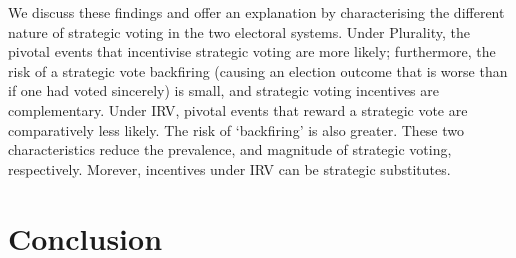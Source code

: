 \documentclass[12pt, letter]{article}
\begin{document}
We discuss these findings and offer an explanation by characterising the different nature of strategic voting in the two electoral systems. Under Plurality, the pivotal events that incentivise strategic voting are more likely; furthermore, the risk of a strategic vote backfiring (causing an election outcome that is worse than if one had voted sincerely) is small, and strategic voting incentives are complementary. Under IRV, pivotal events that reward a strategic vote are comparatively less likely. The risk of `backfiring' is also greater. These two characteristics reduce the prevalence, and magnitude of strategic voting, respectively. Morever, incentives under IRV can be strategic substitutes.

\section{Conclusion}
\end{document}
